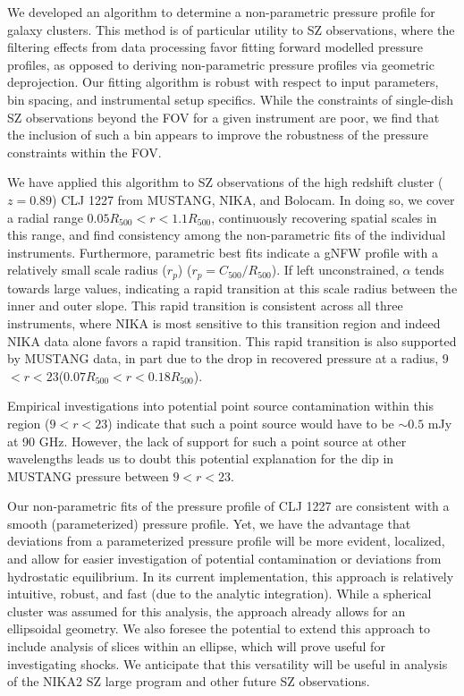 \documentclass[twocolumn,traditabstract]{aa}
\begin{document}
We developed an algorithm to determine a non-parametric pressure profile for galaxy clusters.
This method is of particular utility to SZ observations, where the filtering effects from data
processing favor fitting forward modelled pressure profiles, as opposed to deriving non-parametric pressure profiles via
geometric deprojection. Our fitting algorithm is robust with respect to input parameters,
bin spacing, and instrumental setup specifics. While the constraints of single-dish SZ observations
beyond the FOV for a given instrument are poor, we find that the inclusion of such a bin
appears to improve the robustness of the pressure constraints within the FOV.

We have applied this algorithm to SZ observations of the high redshift cluster ($z = 0.89$)
CLJ 1227 from MUSTANG, NIKA, and Bolocam. In doing so, we cover a radial range
$0.05 R_{500} < r < 1.1 R_{500}$, continuously recovering spatial scales in this range,
and find consistency among the non-parametric fits of the individual instruments. Furthermore,
parametric best fits indicate a gNFW profile with a relatively small scale radius ($r_p$)
($r_p = C_{500}/R_{500}$). If left unconstrained, $\alpha$ tends towards large values, indicating
a rapid transition at this scale radius between the inner and outer slope. This rapid transition
is consistent across all three instruments, where NIKA is most sensitive to this transition
region and indeed NIKA data alone favors a rapid transition. This rapid transition is also
supported by MUSTANG data, in part due to the drop in recovered pressure at a radius,
$9$\asecs $< r < 23$\asec ($0.07 R_{500} < r < 0.18 R_{500}$).

Empirical investigations into potential point source contamination within this region ($9$\asec $< r < 23$\asec)
indicate that such a point source would have to be $\sim 0.5$ mJy at 90 GHz.
However, the lack of support for such a point source at other wavelengths leads us to doubt this potential explanation for
the dip in MUSTANG pressure between $9$\asecs $< r < 23$\asec.

Our non-parametric fits of the pressure profile of CLJ 1227 are consistent with a smooth (parameterized) pressure profile.
Yet, we have the advantage that deviations from a parameterized pressure profile will be more evident, localized, and
allow for easier investigation of potential contamination or deviations from hydrostatic equilibrium. In its current implementation,
this approach is relatively intuitive, robust, and fast (due to the analytic integration). While a spherical cluster was assumed
for this analysis, the approach already allows for an ellipsoidal geometry. We also foresee the potential to extend this approach
to include analysis of slices within an ellipse, which will prove useful for investigating shocks. We anticipate that this
versatility will be useful in analysis of the NIKA2 SZ large program \citet{comis2016} and other future SZ observations.
\end{document}
